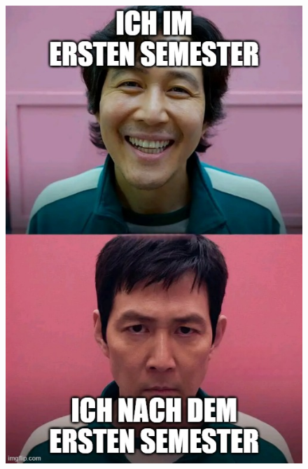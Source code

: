 \documentclass[11pt,a4paper]{article}
\begin{document}
\begin{figure}[h]
    \centering
    \begin{minipage}{0.3\textwidth}
        \centering
        \includegraphics[width=\textwidth]{memes/meme1.jpg}
    \end{minipage}
    \begin{minipage}{0.3\textwidth}
        \centering

\end{minipage}
\end{figure}
\end{document}
